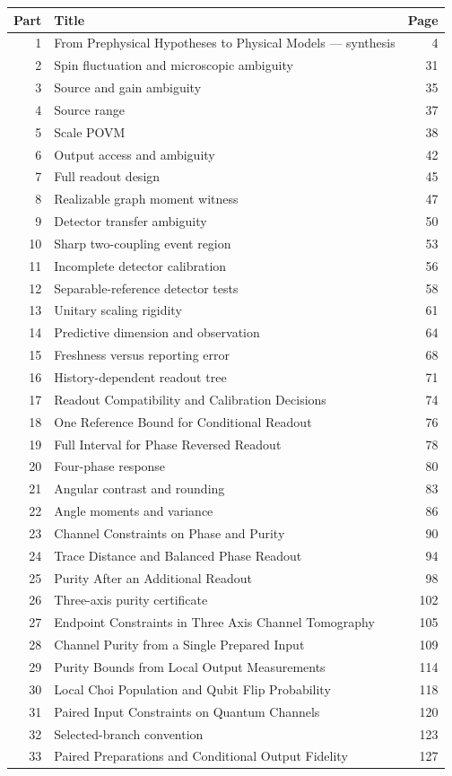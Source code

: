 \documentclass[11pt,a4paper]{article}
\begin{document}
{\small\begin{longtable}{@{}r>{\raggedright\arraybackslash}p{}r@{}}
\toprule Part & Title & Page\\\midrule\endhead
1 & From Prephysical Hypotheses to Physical Models — synthesis & 4\\
2 & Spin fluctuation and microscopic ambiguity & 31\\
3 & Source and gain ambiguity & 35\\
4 & Source range & 37\\
5 & Scale POVM & 38\\
6 & Output access and ambiguity & 42\\
7 & Full readout design & 45\\
8 & Realizable graph moment witness & 47\\
9 & Detector transfer ambiguity & 50\\
10 & Sharp two-coupling event region & 53\\
11 & Incomplete detector calibration & 56\\
12 & Separable-reference detector tests & 58\\
13 & Unitary scaling rigidity & 61\\
14 & Predictive dimension and observation & 64\\
15 & Freshness versus reporting error & 68\\
16 & History-dependent readout tree & 71\\
17 & Readout Compatibility and Calibration Decisions & 74\\
18 & One Reference Bound for Conditional Readout & 76\\
19 & Full Interval for Phase Reversed Readout & 78\\
20 & Four-phase response & 80\\
21 & Angular contrast and rounding & 83\\
22 & Angle moments and variance & 86\\
23 & Channel Constraints on Phase and Purity & 90\\
24 & Trace Distance and Balanced Phase Readout & 94\\
25 & Purity After an Additional Readout & 98\\
26 & Three-axis purity certificate & 102\\
27 & Endpoint Constraints in Three Axis Channel Tomography & 105\\
28 & Channel Purity from a Single Prepared Input & 109\\
29 & Purity Bounds from Local Output Measurements & 114\\
30 & Local Choi Population and Qubit Flip Probability & 118\\
31 & Paired Input Constraints on Quantum Channels & 120\\
32 & Selected-branch convention & 123\\
33 & Paired Preparations and Conditional Output Fidelity & 127\\
\bottomrule\end{longtable}}
\end{document}
